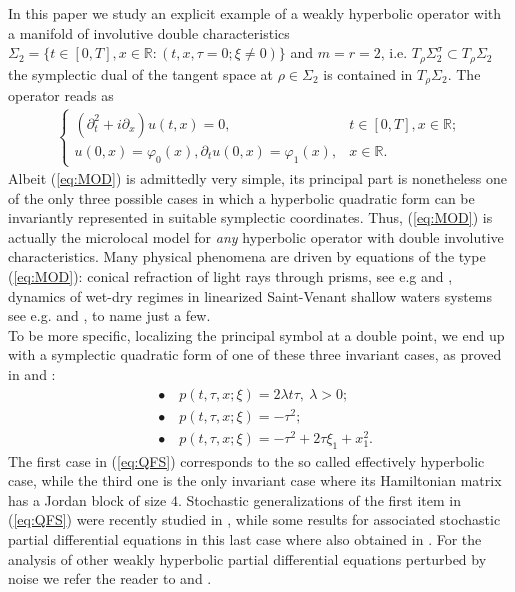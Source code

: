 \documentclass{article}
\def\R{\mathbb{R}}
\begin{document}
In this paper we study an explicit example of a weakly hyperbolic operator with a manifold of involutive double characteristics $ \Sigma_{2}= \{t \in [0,T], x \in \R
: (t,x,\tau=0;\xi\neq 0)\} $ and  $m=r=2$, i.e. $T_{\rho}\Sigma_{2}^{\sigma} \subset T_{\rho}\Sigma_{2} $ the
symplectic dual of the tangent space at $ \rho \in \Sigma_{2} $ is
contained in $ T_{\rho}\Sigma_{2}$. The operator reads as
\begin{align}
  \label{eq:MOD}
  \begin{cases}
  (\partial_{t}^{2} +
    i\partial_{x})u(t,x)=0, & t\in [0,T], x\in\mathbb{R};\\
    u(0,x)=\varphi_0(x), \partial_tu(0,x) = \varphi_1(x), & x\in\mathbb{R}.
    \end{cases}
\end{align}
Albeit (\ref{eq:MOD}) is admittedly very simple, its principal part  is nonetheless one of the only three possible cases in which a hyperbolic quadratic form can be invariantly
represented in suitable symplectic coordinates. Thus, (\ref{eq:MOD}) is actually the microlocal model for \emph{any} hyperbolic operator with double involutive characteristics. Many physical phenomena are driven by equations of the type (\ref{eq:MOD}): conical refraction of light rays through prisms, see e.g \cite{MR544247} and \cite{MR637495}, dynamics of wet-dry regimes in linearized Saint-Venant shallow
waters systems see e.g. \cite{MR1339932} and \cite{MR2761079}, to name just a few.\\
To be more specific, localizing the principal symbol at a double
point, we end up with a symplectic quadratic form  of one of  these three
invariant cases, as proved in \cite{MR781536} and \cite{MR1178557}:
\begin{align}
  \label{eq:QFS}
    &\bullet\!\!\!\!\quad p(t,\tau,x;\xi)= 2\lambda t \tau , ~\lambda >0;\nonumber\\
    &\bullet\!\!\!\!\quad p(t,\tau,x;\xi)= -\tau^{2};\\
    &\bullet\!\!\!\!\quad p(t,\tau,x;\xi)= -\tau^{2} +2\tau\xi_{1} + x_{1}^{2}\nonumber.
\end{align}
The first case in (\ref{eq:QFS}) corresponds to the so called
effectively hyperbolic case, while the third one is the only invariant
case where its Hamiltonian matrix has a Jordan block of size $ 4
$. Stochastic generalizations of the first item in (\ref{eq:QFS}) were
recently studied in \cite{TIN}, while some results for associated stochastic partial differential equations in this last case where also obtained in \cite{SDC}. For the analysis of other weakly hyperbolic partial differential equations perturbed by noise we refer the reader to \cite{MR4087470} and \cite{MR4219195}. \\
\end{document}
